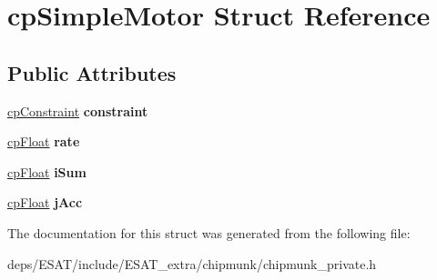\hypertarget{structcp_simple_motor}{}\section{cp\+Simple\+Motor Struct Reference}
\label{structcp_simple_motor}
\subsection*{Public Attributes}
\begin{DoxyCompactItemize}
\item 
\mbox{\label{structcp_simple_motor_a361cbe14d173459992b77702f9a94310}} 
\mbox{\hyperlink{structcp_constraint}{cp\+Constraint}} {\bfseries constraint}
\item 
\mbox{\label{structcp_simple_motor_afca80c08d35ea3b62c740c855eb50116}} 
\mbox{\hyperlink{group__basic_types_gac1ed65573e035bf892505768c852d8d3}{cp\+Float}} {\bfseries rate}
\item 
\mbox{\label{structcp_simple_motor_adda289d079a35a95e84b45f62f046cae}} 
\mbox{\hyperlink{group__basic_types_gac1ed65573e035bf892505768c852d8d3}{cp\+Float}} {\bfseries i\+Sum}
\item 
\mbox{\label{structcp_simple_motor_ac1ff742b93d07fe04d1d6a9590415e68}} 
\mbox{\hyperlink{group__basic_types_gac1ed65573e035bf892505768c852d8d3}{cp\+Float}} {\bfseries j\+Acc}
\end{DoxyCompactItemize}


The documentation for this struct was generated from the following file\+:\begin{DoxyCompactItemize}
\item 
deps/\+E\+S\+A\+T/include/\+E\+S\+A\+T\+\_\+extra/chipmunk/chipmunk\+\_\+private.\+h\end{DoxyCompactItemize}
